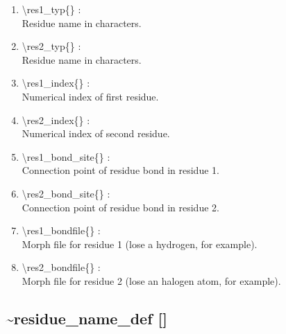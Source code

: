 \documentclass[12pt,titlepage]{article}
\begin{document}
\begin{enumerate}

 \vspace{0.15in} 
 \item  \textbackslash res1\_typ\{\} : \\ 
    Residue name in characters.

 \vspace{0.15in} 
 \item  \textbackslash res2\_typ\{\} : \\ 
    Residue name in characters.

 \vspace{0.15in} 
 \item  \textbackslash res1\_index\{\} : \\ 
    Numerical index of first residue.

 \vspace{0.15in} 
 \item  \textbackslash res2\_index\{\} : \\ 
    Numerical index of second residue.

 \vspace{0.15in} 
 \item  \textbackslash res1\_bond\_site\{\} : \\ 
   Connection point of residue bond in residue 1.

 \vspace{0.15in} 
 \item  \textbackslash res2\_bond\_site\{\} : \\ 
   Connection point of residue bond in residue 2.

 \vspace{0.15in} 
 \item  \textbackslash res1\_bondfile\{\} : \\ 
   Morph file for residue 1 (lose a hydrogen, for example).

 \vspace{0.15in} 
 \item  \textbackslash res2\_bondfile\{\} : \\ 
   Morph file for residue 2 (lose an halogen atom, for example).
  
\end{enumerate}

\newpage
\subsection*{\bf \~{ }residue\_name\_def []}
\end{document}

